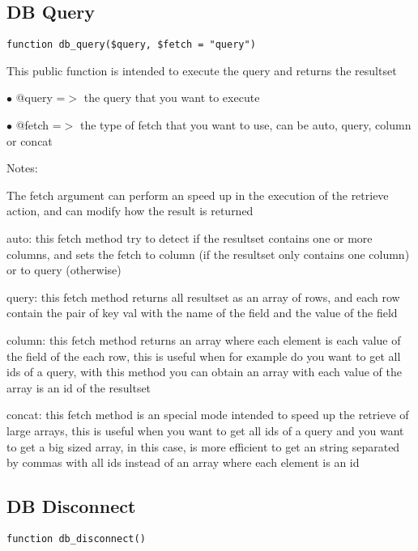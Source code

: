 \documentclass[a4paper]{book}
\begin{document}
\hypertarget{toc64}{}
\subsection{DB Query}

\begin{lstlisting}
function db_query($query, $fetch = "query")
\end{lstlisting}

This public function is intended to execute the query and returns the resultset

\begin{compactitem}
\item[\color{myblue}$\bullet$] @query =$>$ the query that you want to execute
\item[\color{myblue}$\bullet$] @fetch =$>$ the type of fetch that you want to use, can be auto, query, column or concat
\end{compactitem}

Notes:

The fetch argument can perform an speed up in the execution of the retrieve action, and
can modify how the result is returned

auto: this fetch method try to detect if the resultset contains one or more columns, and
sets the fetch to column (if the resultset only contains one column) or to query (otherwise)

query: this fetch method returns all resultset as an array of rows, and each row contain the
pair of key val with the name of the field and the value of the field

column: this fetch method returns an array where each element is each value of the field of
the each row, this is useful when for example do you want to get all ids of a query, with
this method you can obtain an array with each value of the array is an id of the resultset

concat: this fetch method is an special mode intended to speed up the retrieve of large
arrays, this is useful when you want to get all ids of a query and you want to get a big
sized array, in this case, is more efficient to get an string separated by commas with all
ids instead of an array where each element is an id

\hypertarget{toc65}{}
\subsection{DB Disconnect}

\begin{lstlisting}
function db_disconnect()
\end{lstlisting}
\end{document}

